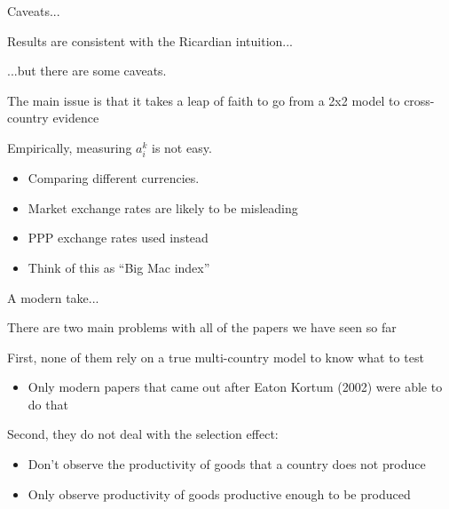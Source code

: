 \documentclass[notes,11pt, aspectratio=169, xcolor=table]{beamer}
\newenvironment{wideitemize}{\itemize\addtolength{\itemsep}{10pt}}{\enditemize}
\begin{document}
\begin{frame}{Caveats...}
\begin{wideitemize}
    \item Results are consistent with the Ricardian intuition...

    \item ...but there are some caveats.

    \item The main issue is that it takes a leap of faith to go from a 2x2 model to cross-country evidence

    \item Empirically, measuring $a_i^k$ is not easy.

    \begin{itemize}
        \item Comparing different currencies.
        \item Market exchange rates are likely to be misleading
        \item PPP exchange rates  used instead
        \item Think of this as ``Big Mac index''
    \end{itemize}
\end{wideitemize}

\end{frame}

\begin{frame}{A modern take...}
\begin{wideitemize}
    \item There are two main problems with all of the papers we have seen so far

    \item First, none of them rely on a true multi-country model to know what to test
    \begin{itemize}
        \item Only modern papers that came out after Eaton Kortum (2002) were able to do that 
    \end{itemize}

    \item Second, they do not deal with the selection effect:
    \begin{itemize}
        \item Don't observe the productivity of goods that a country does not produce
        \item Only observe productivity of goods productive enough to be produced
    \end{itemize}
    
\end{wideitemize}

\end{frame}
\end{document}
